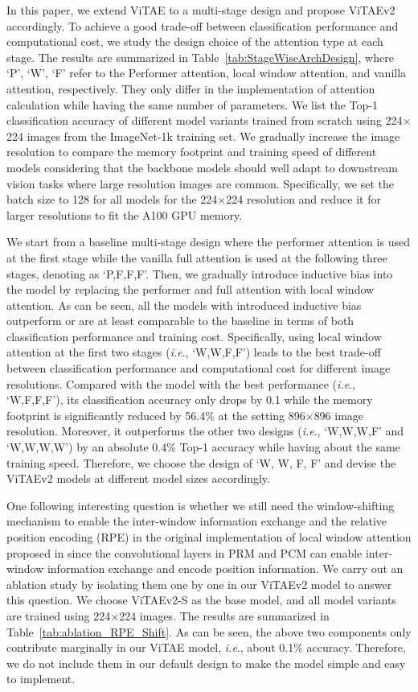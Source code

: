 \documentclass[twocolumn]{svjour3}          \smartqed  \usepackage{natbib}
\newcommand{\ie}{i.e}
\def\onedot{.\xspace}
\def\ie{\emph{i.e}\onedot}
\begin{document}
In this paper, we extend ViTAE to a multi-stage design and propose ViTAEv2 accordingly. To achieve a good trade-off between classification performance and computational cost, we study the design choice of the attention type at each stage. The results are summarized in Table~\ref{tab:StageWiseArchDesign}, where `P', `W', `F' refer to the Performer attention, local window attention, and vanilla attention, respectively. They only differ in the implementation of attention calculation while having the same number of parameters. We list the Top-1 classification accuracy of different model variants trained from scratch using 224$\times$224 images from the ImageNet-1k training set. We gradually increase the image resolution to compare the memory footprint and training speed of different models considering that the backbone models should well adapt to downstream vision tasks where large resolution images are common. Specifically, we set the batch size to 128 for all models for the 224$\times$224 resolution and reduce it for larger resolutions to fit the A100 GPU memory. 

We start from a baseline multi-stage design where the performer attention is used at the first stage while the vanilla full attention is used at the following three stages, denoting as `P,F,F,F'. Then, we gradually introduce inductive bias into the model by replacing the performer and full attention with local window attention. As can be seen, all the models with introduced inductive bias outperform or are at least comparable to the baseline in terms of both classification performance and training cost. Specifically, using local window attention at the first two stages (\ie, `W,W,F,F') leads to the best trade-off between classification performance and computational cost for different image resolutions. Compared with the model with the best performance (\ie, `W,F,F,F'), its classification accuracy only drops by 0.1 while the memory footprint is significantly reduced by 56.4\% at the setting 896$\times$896 image resolution. Moreover, it outperforms the other two designs (\ie, `W,W,W,F' and `W,W,W,W') by an absolute 0.4\% Top-1 accuracy while having about the same training speed. Therefore, we choose the design of `W, W, F, F' and devise the ViTAEv2 models at different model sizes accordingly.

One following interesting question is whether we still need the window-shifting mechanism to enable the inter-window information exchange and the relative position encoding (RPE) in the original implementation of local window attention proposed in \citep{liu2021swin} since the convolutional layers in PRM and PCM can enable inter-window information exchange and encode position information. We carry out an ablation study by isolating them one by one in our ViTAEv2 model to answer this question. We choose ViTAEv2-S as the base model, and all model variants are trained using 224$\times$224 images. The results are summarized in Table~\ref{tab:ablation_RPE_Shift}. As can be seen, the above two components only contribute marginally in our ViTAE model, \ie, about 0.1\% accuracy. Therefore, we do not include them in our default design to make the model simple and easy to implement. 
\end{document}
